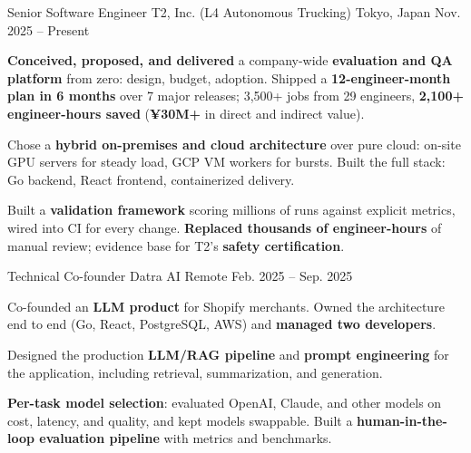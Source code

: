 
\begin{cventries}
    \cventry
    {Senior Software Engineer} %
    {T2, Inc. (L4 Autonomous Trucking)} %
    {Tokyo, Japan} %
  {Nov. 2025 -- Present} %
    {
      \begin{cvitems} %
        \item {\textbf{Conceived, proposed, and delivered} a company-wide \textbf{evaluation and QA platform} from zero: design, budget, adoption. Shipped a \textbf{12-engineer-month plan in 6 months} over 7 major releases; 3,500+ jobs from 29 engineers, \textbf{2,100+ engineer-hours saved} (\textbf{¥30M+} in direct and indirect value).}
        \item {Chose a \textbf{hybrid on-premises and cloud architecture} over pure cloud: on-site GPU servers for steady load, GCP VM workers for bursts. Built the full stack: Go backend, React frontend, containerized delivery.}
        \item {Built a \textbf{validation framework} scoring millions of runs against explicit metrics, wired into CI for every change. \textbf{Replaced thousands of engineer-hours} of manual review; evidence base for T2's \textbf{safety certification}.}
      \end{cvitems}
    }

    \vspace{2mm}


    \cventry
    {Technical Co-founder} %
    {Datra AI} %
    {Remote} %
  {Feb. 2025 -- Sep. 2025} %
    {
      \begin{cvitems} %
    \item {Co-founded an \textbf{LLM product} for Shopify merchants. Owned the architecture end to end (Go, React, PostgreSQL, AWS) and \textbf{managed two developers}.}
    \item {Designed the production \textbf{LLM/RAG pipeline} and \textbf{prompt engineering} for the application, including retrieval, summarization, and generation.}
    \item {\textbf{Per-task model selection}: evaluated OpenAI, Claude, and other models on cost, latency, and quality, and kept models swappable. Built a \textbf{human-in-the-loop evaluation pipeline} with metrics and benchmarks.}
      \end{cvitems}
    }


\end{cventries}
